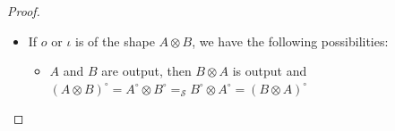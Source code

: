 \documentclass{lmcs}
\newcommand*{\tens}{\otimes} %
\newcommand*{\lolipop}{\multimap} %
\newcommand*{\eqeq}{=} %
\newcommand*{\thS}{\mathcal{S}}
\newcommand*{\isoo}{\eqeq_\thS} %
\newcommand*{\iform}{\iota}
\newcommand*{\tradi}[1]{{#1}^\bullet}
\newcommand*{\bigtradi}[1]{\tradi{(#1)}}
\newcommand*{\trado}[1]{{#1}^\circ}
\newcommand*{\bigtrado}[1]{\trado{(#1)}}
\begin{document}
\begin{proof}
\begin{itemize}
  \begin{itemize}
  \item $A$, $B$ and $C$ are output, then $(A\tens B)\tens C$ is output and:
    \begin{align*}
      \bigtrado{A\tens(B\tens C)} &= \trado{A}\tens(\trado{B}\tens\trado{C}) \\
       &\isoo (\trado{A}\tens\trado{B})\tens\trado{C} = \bigtrado{(A\tens B)\tens C}
    \end{align*}
  \item $A$ and $B$ are output and $C$ is input, then $(A\tens B)\tens C$ is input and:
    \begin{align*}
      \bigtradi{A\tens(B\tens C)} &= \trado{A}\lolipop(\trado{B}\lolipop\tradi{C}) \\
       &\isoo (\trado{A}\tens\trado{B})\lolipop\tradi{C} = \bigtradi{(A\tens B)\tens C}
    \end{align*}
  \item $A$ and $C$ are output and $B$ is input, then $(A\tens B)\tens C$ is input and:
    \begin{align*}
      \bigtradi{A\tens(B\tens C)} &= \trado{A}\lolipop(\trado{C}\lolipop\tradi{B}) \\
       &\isoo (\trado{A}\tens\trado{C})\lolipop\tradi{B} \isoo (\trado{C}\tens\trado{A})\lolipop\tradi{B} \\
       &\isoo \trado{C}\lolipop(\trado{A}\lolipop\tradi{B}) = \bigtradi{(A\tens B)\tens C}
    \end{align*}
  \item $A$ is input and $B$ and $C$ are output, then $(A\tens B)\tens C$ is input and:
    \begin{align*}
      \bigtradi{A\tens(B\tens C)} &= (\trado{B}\tens\trado{C})\lolipop\tradi{A} \\
          &\isoo (\trado{C}\tens\trado{B})\lolipop\tradi{A} \\
       &\isoo \trado{C}\lolipop(\trado{B}\lolipop\tradi{A}) = \bigtradi{(A\tens B)\tens C}
    \end{align*}
  \end{itemize}
The symmetric case follows the same pattern, as well as associativity of $\parr$.
\item If $o$ or $\iform$ is of the shape $A\tens B$, we have the following possibilities:
  \begin{itemize}
  \item $A$ and $B$ are output, then $B\tens A$ is output and $\bigtrado{A\tens B} = \trado{A}\tens\trado{B} \isoo \trado{B}\tens\trado{A} = \bigtrado{B\tens A}$

\end{itemize}
\end{itemize}
\end{proof}
\end{document}
